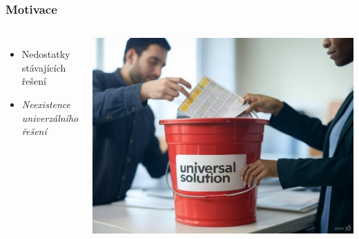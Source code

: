 \begin{frame}
  \frametitle{Motivace}
  \begin{columns}
    \begin{itemize}
        \item Nedostatky stávajících řešení
        \item \emph{Neexistence univerzálního řešení}
        \phantom{\item Neexistence triviálně použitelného řešení}
    \end{itemize}
     
    \includegraphics[width=\textwidth]{img/universal-solution.jpg}
  \end{columns}
\end{frame}

